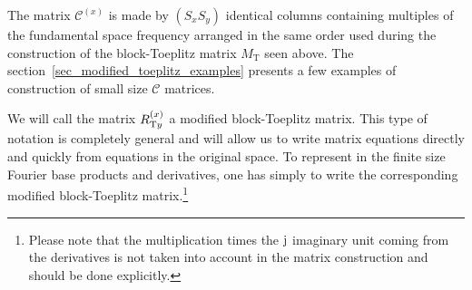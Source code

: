 The matrix $\mathcal{C}^{(x)}$ is made by $(S_x S_y)$ identical columns containing multiples of the fundamental space frequency arranged in the same order used during the construction of the block-Toeplitz matrix $M_\mathrm{T}$ seen above.
The section~\ref{sec_modified_toeplitz_examples} presents a few examples of construction of small size $\mathcal{C}$ matrices.

We will call the matrix $R_{\mathrm{T} y}^{(x)}$ a modified block-Toeplitz matrix.
This type of notation is completely general and will allow us to write  matrix equations directly and quickly from equations in the original space. To represent in the finite size Fourier base products and derivatives, one has simply to write the corresponding modified block-Toeplitz matrix.\footnote{Please note that the multiplication times the $\mathrm{j}$ imaginary unit coming from the derivatives is not taken into account in the matrix construction and should be done explicitly.}

